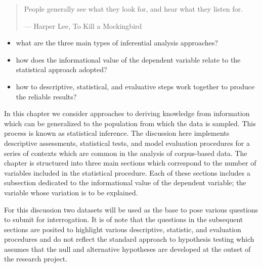 \documentclass[
  letterpaper,
]{latex/krantz}
\providecommand{\tightlist}{%
  \setlength{\itemsep}{0pt}\setlength{\parskip}{0pt}}\usepackage{longtable,booktabs,array}
\begin{document}
\begin{quote}
People generally see what they look for, and hear what they listen for.

--- Harper Lee, To Kill a Mockingbird
\end{quote}

\begin{tcolorbox}[enhanced jigsaw, colbacktitle=quarto-callout-note-color!10!white, arc=.35mm, toprule=.15mm, breakable, colframe=quarto-callout-note-color-frame, bottomrule=.15mm, opacitybacktitle=0.6, coltitle=black, titlerule=0mm, colback=white, toptitle=1mm, bottomtitle=1mm, title=\textcolor{quarto-callout-note-color}{\faInfo}\hspace{0.5em}{Keys}, rightrule=.15mm, leftrule=.75mm, opacityback=0, left=2mm]

\begin{itemize}
\tightlist
\item
  what are the three main types of inferential analysis approaches?
\item
  how does the informational value of the dependent variable relate to
  the statistical approach adopted?
\item
  how to descriptive, statistical, and evaluative steps work together to
  produce the reliable results?
\end{itemize}

\end{tcolorbox}

In this chapter we consider approaches to deriving knowledge from
information which can be generalized to the population from which the
data is sampled. This process is known as statistical inference. The
discussion here implements descriptive assessments, statistical tests,
and model evaluation procedures for a series of contexts which are
common in the analysis of corpus-based data. The chapter is structured
into three main sections which correspond to the number of variables
included in the statistical procedure. Each of these sections includes a
subsection dedicated to the informational value of the dependent
variable; the variable whose variation is to be explained.

For this discussion two datasets will be used as the base to pose
various questions to submit for interrogation. It is of note that the
questions in the subsequent sections are posited to highlight various
descriptive, statistic, and evaluation procedures and do not reflect the
standard approach to hypothesis testing which assumes that the null and
alternative hypotheses are developed at the outset of the research
project.
\end{document}
